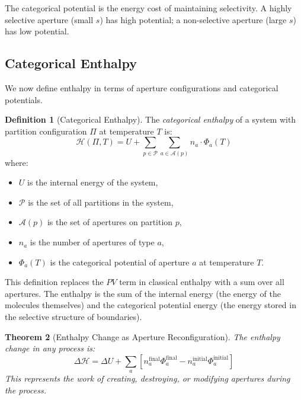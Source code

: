 \documentclass[12pt,a4paper]{article}
\newtheorem{theorem}{Theorem}[section]
\theoremstyle{definition}
\newtheorem{definition}[theorem]{Definition}
\theoremstyle{remark}
\begin{document}
The categorical potential is the energy cost of maintaining selectivity. A highly selective aperture (small $s$) has high potential; a non-selective aperture (large $s$) has low potential.

\subsection{Categorical Enthalpy}

We now define enthalpy in terms of aperture configurations and categorical potentials.

\begin{definition}[Categorical Enthalpy]
\label{def:categorical_enthalpy}
The \emph{categorical enthalpy} of a system with partition configuration $\Pi$ at temperature $T$ is:
\begin{equation}
\mathcal{H}(\Pi, T) = U + \sum_{p \in \mathcal{P}} \sum_{a \in \mathcal{A}(p)} n_a \cdot \Phi_a(T)
\end{equation}
where:
\begin{itemize}
    \item $U$ is the internal energy of the system,
    \item $\mathcal{P}$ is the set of all partitions in the system,
    \item $\mathcal{A}(p)$ is the set of apertures on partition $p$,
    \item $n_a$ is the number of apertures of type $a$,
    \item $\Phi_a(T)$ is the categorical potential of aperture $a$ at temperature $T$.
\end{itemize}
\end{definition}

This definition replaces the $PV$ term in classical enthalpy with a sum over all apertures. The enthalpy is the sum of the internal energy (the energy of the molecules themselves) and the categorical potential energy (the energy stored in the selective structure of boundaries).

\begin{theorem}[Enthalpy Change as Aperture Reconfiguration]
\label{thm:enthalpy_aperture}
The enthalpy change in any process is:
\begin{equation}
\Delta\mathcal{H} = \Delta U + \sum_a \left[ n_a^{\text{final}} \Phi_a^{\text{final}} - n_a^{\text{initial}} \Phi_a^{\text{initial}} \right]
\end{equation}
This represents the work of creating, destroying, or modifying apertures during the process.
\end{theorem}
\end{document}
